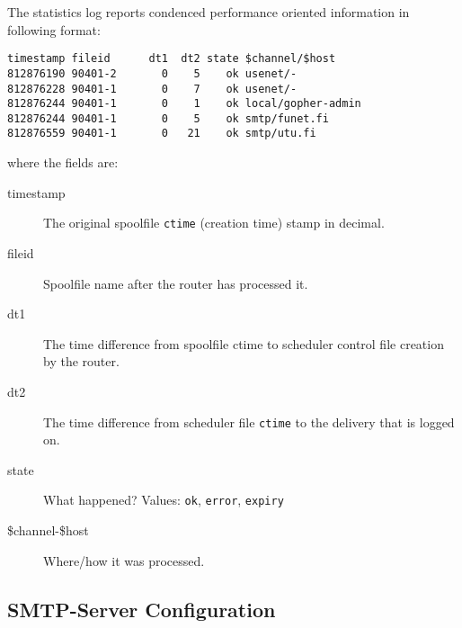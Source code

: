 The  statistics log reports condenced performance oriented
information in following format:
\begin{tscreen}
\begin{verbatim}
timestamp fileid      dt1  dt2 state $channel/$host
812876190 90401-2       0    5    ok usenet/-
812876228 90401-1       0    7    ok usenet/-
812876244 90401-1       0    1    ok local/gopher-admin
812876244 90401-1       0    5    ok smtp/funet.fi
812876559 90401-1       0   21    ok smtp/utu.fi
\end{verbatim}
\end{tscreen}

where the fields are:
\begin{description}
\item[timestamp] \mbox{}

The original spoolfile {\tt ctime} (creation time)  stamp
in decimal.



\item[fileid] \mbox{}

Spoolfile name after the router has processed it.



\item[dt1] \mbox{}

The time difference from spoolfile ctime to 
scheduler control file creation by the router.



\item[dt2] \mbox{}

The time difference from scheduler file {\tt ctime} to
the delivery that is logged on.



\item[state] \mbox{}

What happened?  Values: {\tt ok}, {\tt error}, {\tt expiry}



\item[\$channel-\$host] \mbox{}

Where/how it was processed.

\end{description}









\subsection{SMTP-Server Configuration}

